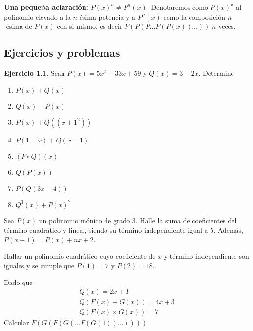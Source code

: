 \textbf{Una pequeña aclaración:} $P(x)^n \neq P^n(x)$. Denotaremos como $P(x)^n$ al polinomio elevado a la $n$-ésima potencia y a $P^n(x)$ como la composición $n$-ésima de $P(x)$ con si mismo, es decir $P(P(P\dots P(P(x))\dots))$ $n$ veces.


\subsection{Ejercicios y problemas}

\textbf{Ejercicio 1.1.} Sean $P(x) = 5x^2 - 33x + 59$ y $Q(x) = 3 - 2x$. Determine
\begin{multicols}{2}
    \begin{enumerate}
        \item $P(x) + Q(x)$
        \item $Q(x) - P(x)$
        \item $P(x) + Q((x+1^2))$
        \item $P(1-x) + Q(x-1)$
        \item $(P\circ Q)(x)$
        \item $Q(P(x))$
        \item $P(Q(3x - 4))$
        \item $Q^3(x) + P(x)^2$
    \end{enumerate}
\end{multicols}

\begin{section-problem}
    Sea $P(x)$ un polinomio mónico de grado 3. Halle la suma de coeficientes del término cuadrático y lineal, siendo su término independiente igual a 5. Además, $P(x + 1) = P(x) + nx + 2$.
\end{section-problem}

\begin{section-problem}
    Hallar un polinomio cuadrático cuyo coeficiente de $x$ y término independiente son iguales y se cumple que $P(1) = 7$ y $P(2) = 18$.
\end{section-problem}

\begin{section-problem}
    Dado que
        \begin{gather*}
            Q(x) = 2x + 3 \\
            Q( F(x) + G(x) ) = 4x + 3 \\
            Q( F(x) \times G(x) ) = 7
        \end{gather*}
    Calcular $F(G(F(G(\dots F(G(1))\dots))))$.
\end{section-problem}